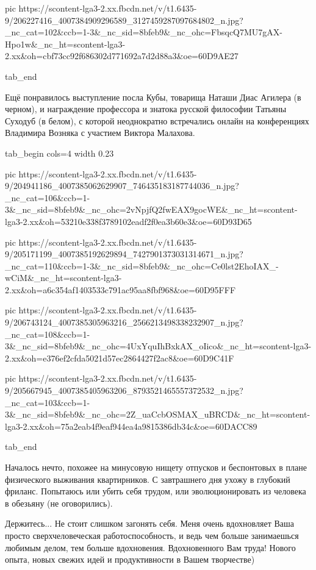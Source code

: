      pic https://scontent-lga3-2.xx.fbcdn.net/v/t1.6435-9/206227416_4007384909296589_3127459287097684802_n.jpg?_nc_cat=102&ccb=1-3&_nc_sid=8bfeb9&_nc_ohc=FbsqcQ7MU7gAX-Hpo1w&_nc_ht=scontent-lga3-2.xx&oh=cbf73cc92f686302d771692a7d2d88a3&oe=60D9AE27

  tab_end
\fi

Ещё понравилось выступление посла Кубы, товарища Наташи Диас Агилера (в черном),
и награждение профессора и знатока русской философии Татьяны Суходуб (в белом),
с которой неоднократно встречались онлайн на конференциях Владимира Возняка с
участием Виктора Малахова. 

\ifcmt
  tab_begin cols=4
    width 0.23

     pic https://scontent-lga3-2.xx.fbcdn.net/v/t1.6435-9/204941186_4007385062629907_746435183187744036_n.jpg?_nc_cat=106&ccb=1-3&_nc_sid=8bfeb9&_nc_ohc=2vNpjfQ2fwEAX9gocWE&_nc_ht=scontent-lga3-2.xx&oh=53210e338f3789102eadf2f0ea3b60e3&oe=60D93D65

     pic https://scontent-lga3-2.xx.fbcdn.net/v/t1.6435-9/205171199_4007385192629894_7427901373031314671_n.jpg?_nc_cat=110&ccb=1-3&_nc_sid=8bfeb9&_nc_ohc=Ce0lst2EhoIAX_-wCiM&_nc_ht=scontent-lga3-2.xx&oh=a6c354af1403533c791ac95aa8fbf968&oe=60D95FFF

     pic https://scontent-lga3-2.xx.fbcdn.net/v/t1.6435-9/206743124_4007385305963216_2566213498338232907_n.jpg?_nc_cat=108&ccb=1-3&_nc_sid=8bfeb9&_nc_ohc=4UxYquIhBxkAX_oIico&_nc_ht=scontent-lga3-2.xx&oh=e376ef2cfda5021d57ec2864427f2ac8&oe=60D9C41F

     pic https://scontent-lga3-2.xx.fbcdn.net/v/t1.6435-9/205667945_4007385405963206_8793521465557372532_n.jpg?_nc_cat=103&ccb=1-3&_nc_sid=8bfeb9&_nc_ohc=2Z_uaCcbOSMAX_uBRCD&_nc_ht=scontent-lga3-2.xx&oh=75a2eab4f9eaf944ea4a9815386db34c&oe=60DACC89

  tab_end
\fi

Началось нечто, похожее на минусовую нищету отпусков и беспонтовых в плане
физического выживания квартирников. С завтрашнего дня ухожу в глубокий фриланс.
Попытаюсь или убить себя трудом, или эволюционировать из человека в обезьяну
(не оговорились).

\begin{itemize}

Держитесь... Не стоит слишком загонять себя. Меня очень вдохновляет Ваша просто
сверхчеловеческая работоспособность, и ведь чем больше занимаешься любимым
делом, тем больше вдохновения. Вдохновенного Вам труда! Нового опыта, новых
свежих идей и продуктивности в Вашем творчестве)

\end{itemize}
